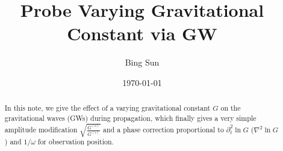 \documentclass[
 jor,
 amsmath,amssymb,preprint,
]{revtex4-2}
\begin{document}

\title[Probe Varying Gravitational Constant via GW]{Probe Varying Gravitational Constant via GW}%



\author{Bing Sun}
%

\date{\today}%

\begin{abstract}
In this note, we give the effect of a varying gravitational constant $G$ on the gravitational waves (GWs) during propagation, which finally gives a very simple amplitude modification $\sqrt{\frac{G^{(o)}}{G^{(s)}}}$ and a phase correction proportional to ${\partial_t^2}\ln G$ ($\nabla^2 \ln G$) and $1/\omega$ for observation position.
%
\end{abstract}


\maketitle
\end{document}

